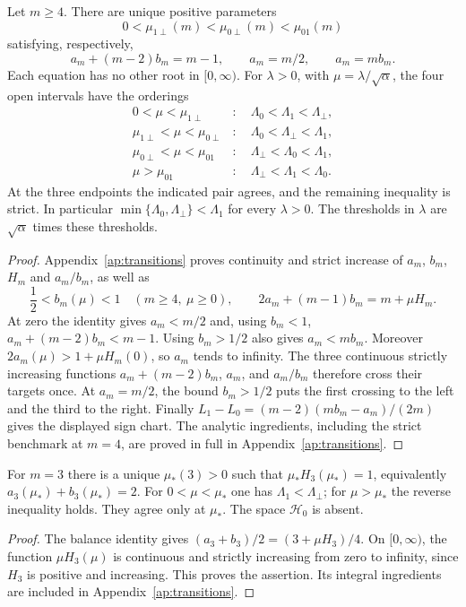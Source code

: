 \begin{theorem}\label{thm:ordered-switches}
Let $m\ge4$. There are unique positive parameters
\[
 0<\mu_{1\perp}(m)<\mu_{0\perp}(m)<\mu_{01}(m)
\]
satisfying, respectively,
\[
 a_m+(m-2)b_m=m-1,\qquad a_m=m/2,\qquad a_m=mb_m.
\]
Each equation has no other root in $[0,\infty)$. For $\lambda>0$,
with $\mu=\lambda/\sqrt\alpha$, the four open intervals have the orderings
\begin{align*}
 0<\mu<\mu_{1\perp}&:\quad \Lambda_0<\Lambda_1<\Lambda_\perp,\\
 \mu_{1\perp}<\mu<\mu_{0\perp}&:\quad \Lambda_0<\Lambda_\perp<\Lambda_1,\\
 \mu_{0\perp}<\mu<\mu_{01}&:\quad \Lambda_\perp<\Lambda_0<\Lambda_1,\\
 \mu>\mu_{01}&:\quad \Lambda_\perp<\Lambda_1<\Lambda_0.
\end{align*}
At the three endpoints the indicated pair agrees, and the remaining
inequality is strict. In particular
$\min\{\Lambda_0,\Lambda_\perp\}<\Lambda_1$ for every $\lambda>0$.
The thresholds in $\lambda$ are $\sqrt\alpha$ times these thresholds.
\end{theorem}

\begin{proof}
Appendix~\ref{ap:transitions} proves continuity and strict increase of
$a_m$, $b_m$, $H_m$ and $a_m/b_m$, as well as
\[
 \frac12<b_m(\mu)<1\quad(m\ge4,\ \mu\ge0),\qquad
 2a_m+(m-1)b_m=m+\mu H_m.
\]
At zero the identity gives $a_m<m/2$ and, using $b_m<1$,
$a_m+(m-2)b_m<m-1$. Using $b_m>1/2$ also gives $a_m<mb_m$.
Moreover $2a_m(\mu)>1+\mu H_m(0)$, so $a_m$ tends to infinity.
The three continuous strictly increasing functions
$a_m+(m-2)b_m$, $a_m$, and $a_m/b_m$ therefore cross their targets once.
At $a_m=m/2$, the bound $b_m>1/2$ puts the first crossing to the left
and the third to the right. Finally
$L_1-L_0=(m-2)(mb_m-a_m)/(2m)$ gives the displayed sign chart.
The analytic ingredients, including the strict benchmark at $m=4$,
are proved in full in Appendix~\ref{ap:transitions}.
\end{proof}

\begin{theorem}\label{thm:triangular-switch}
For $m=3$ there is a unique $\mu_*(3)>0$ such that
$\mu_*H_3(\mu_*)=1$, equivalently $a_3(\mu_*)+b_3(\mu_*)=2$.
For $0<\mu<\mu_*$ one has $\Lambda_1<\Lambda_\perp$; for
$\mu>\mu_*$ the reverse inequality holds. They agree only at $\mu_*$.
The space $\mathcal H_0$ is absent.
\end{theorem}
\begin{proof}
The balance identity gives
$(a_3+b_3)/2=(3+\mu H_3)/4$.
On $[0,\infty)$, the function $\mu H_3(\mu)$ is continuous and strictly
increasing from zero to infinity, since $H_3$ is positive and increasing.
This proves the assertion. Its integral ingredients are included in
Appendix~\ref{ap:transitions}.
\end{proof}

